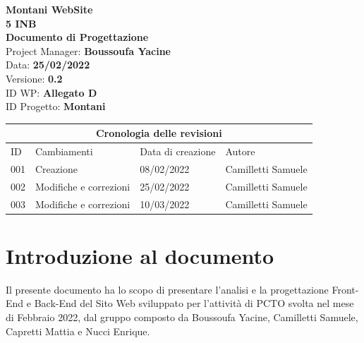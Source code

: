 \documentclass{article}
\begin{document}
	
	
	\begin{titlepage}
		\begin{center}
			\huge\textbf{Montani WebSite}\\
			\Large\textbf{5 INB}\\
			\Large \textbf{Documento di Progettazione}\\
			\vspace{4cm}
			\large Project Manager: \textbf{Boussoufa Yacine}\\
			\large Data: \textbf{25/02/2022}\\
			\large Versione: \textbf{0.2}\\
			\large ID WP: \textbf{Allegato D}\\
			\large ID Progetto: \textbf{Montani}\\
			
		\end{center}
	\end{titlepage}
	
	\clearpage
	
	\begin{tabular}{ |p{1cm}|p{4cm}|p{3cm}|p{2cm}|  }
		\hline
		\multicolumn{4}{|c|}{Cronologia delle revisioni} \\
		\hline
		ID& Cambiamenti &Data di creazione&Autore\\
		\hline
		001   & Creazione    &08/02/2022&   Camilletti Samuele\\
		\hline
		002   & Modifiche e correzioni    &25/02/2022&   Camilletti Samuele\\
		\hline
		003   & Modifiche e correzioni    &10/03/2022&   Camilletti Samuele\\
\hline
	\end{tabular}
	
	\clearpage
	
	\tableofcontents
	\printindex	
	
   

	\section{\textbf{Introduzione al documento}}
	\flushleft
	\normalsize
	Il presente documento ha lo scopo di presentare l'analisi e la progettazione Front-End e Back-End del Sito Web sviluppato per l'attività di PCTO svolta nel mese di Febbraio 2022, dal gruppo composto da Boussoufa Yacine, Camilletti Samuele, Capretti Mattia e Nucci Enrique.
	\normalsize
\end{document}
